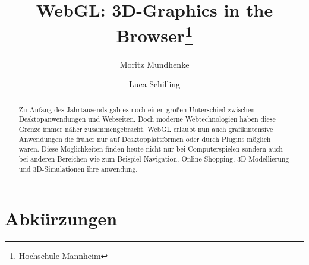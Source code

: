 \documentclass[runningheads]{llncs}
\begin{document}
%
\title{WebGL: 3D-Graphics in the Browser\thanks{Hochschule Mannheim}}
%
%
\author{Moritz Mundhenke \and
Luca Schilling}
%
%
%
\maketitle              %
%


\begin{abstract}
Zu Anfang des Jahrtausends gab es noch einen großen Unterschied zwischen Desktopanwendungen und Webseiten. Doch moderne Webtechnologien haben diese Grenze immer näher zusammengebracht. WebGL erlaubt nun auch grafikintensive Anwendungen die früher nur auf Desktopplattformen oder durch Plugins möglich waren. Diese Möglichkeiten finden heute nicht nur bei Computerspielen sondern auch bei anderen Bereichen wie zum Beispiel Navigation, Online Shopping, 3D-Modellierung und 3D-Simulationen ihre anwendung.
\end{abstract}
%
%
%











\section*{Abkürzungen}
\begin{acronym}[Wasm]
\end{acronym}


{}

\end{document}
